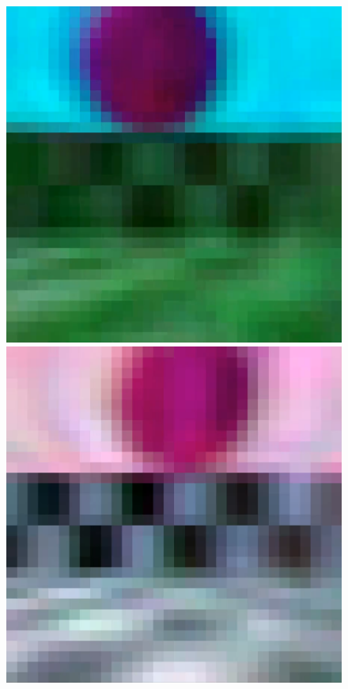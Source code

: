 \begin{figure}[p]
  \centering
  \includegraphics[width=\imgWidth]{images/workflow/FunctionalF1.png} \\[\picVdist]
  \includegraphics[width=\imgWidth]{images/workflow/FunctionalF2.png} \\[\picVdist]

\end{figure}
